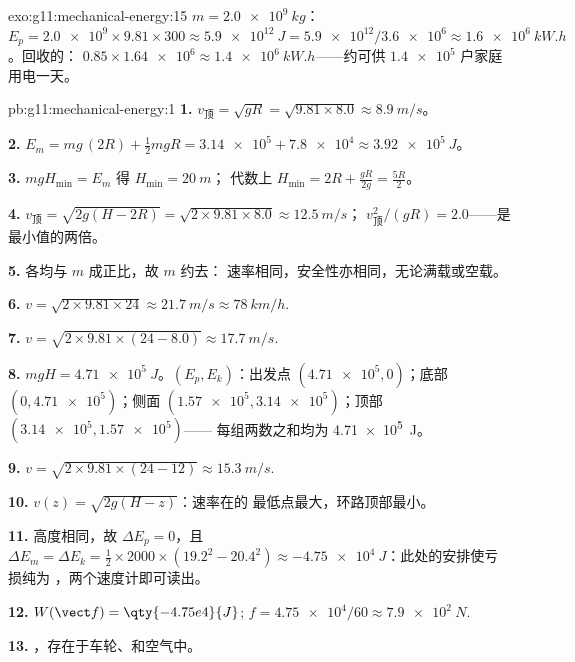\begin{solution}{exo:g11:mechanical-energy:15}
$m = \qty{2.0e9}{kg}$：
$E_p = \num{2.0e9} \times 9.81 \times 300 \approx \qty{5.9e12}{J}
= \num{5.9e12}/\num{3.6e6} \approx \qty{1.6e6}{kW.h}$。回收的：
$0.85 \times \num{1.64e6} \approx \qty{1.4e6}{kW.h}$——约可供
$\num{1.4e5}$ 户家庭用电一天。
\end{solution}

\begin{solution}{pb:g11:mechanical-energy:1}
\textbf{1.} $v_{\text{顶}} = \sqrt{gR} = \sqrt{9.81 \times 8.0}
\approx \qty{8.9}{m/s}$。

\textbf{2.} $E_m = mg\,(2R) + \tfrac12 m gR = \num{3.14e5} +
\num{7.8e4} \approx \qty{3.92e5}{J}$。

\textbf{3.} $mgH_{\min} = E_m$ 得 $H_{\min} = \qty{20}{m}$；
代数上 $H_{\min} = 2R + \frac{gR}{2g} = \frac{5R}{2}$。

\textbf{4.} $v_{\text{顶}} = \sqrt{2g(H - 2R)} =
\sqrt{2 \times 9.81 \times 8.0} \approx \qty{12.5}{m/s}$；
$v_{\text{顶}}^2/(gR) = 2.0$——是最小值的两倍。

\textbf{5.} 各均与 $m$ 成正比，故 $m$ 约去：
速率相同，安全性亦相同，无论满载或空载。

\textbf{6.} $v = \sqrt{2 \times 9.81 \times 24} \approx \qty{21.7}{m/s}
\approx \qty{78}{km/h}$.

\textbf{7.} $v = \sqrt{2 \times 9.81 \times (24 - 8.0)} \approx
\qty{17.7}{m/s}$.

\textbf{8.} $mgH = \qty{4.71e5}{J}$。$(E_p, E_k)$：出发点
$(\num{4.71e5}, 0)$；底部 $(0, \num{4.71e5})$；侧面
$(\num{1.57e5}, \num{3.14e5})$；顶部 $(\num{3.14e5}, \num{1.57e5})$——
每组两数之和均为 \qty{4.71e5}{J}。

\textbf{9.} $v = \sqrt{2 \times 9.81 \times (24 - 12)} \approx
\qty{15.3}{m/s}$.

\textbf{10.} $v(z) = \sqrt{2g(H - z)}$：速率在的
最低点最大，环路顶部最小。

\textbf{11.} 高度相同，故 $\Delta E_p = 0$，且
$\Delta E_m = \Delta E_k = \tfrac12 \times 2000 \times (19.2^2 -
20.4^2) \approx \qty{-4.75e4}{J}$：此处的安排使亏损纯为
，两个速度计即可读出。

\textbf{12.} $W(\vect f) = \qty{-4.75e4}{J}$;
$f = \num{4.75e4}/60 \approx \qty{7.9e2}{N}$.

\textbf{13.} ，存在于车轮、和空气中。


\end{solution}

